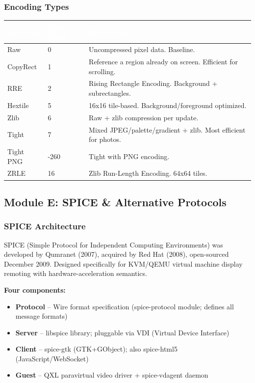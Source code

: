 \documentclass[11pt,letterpaper]{article}
\newcommand{\tableheader}[1]{\textbf{\sffamily\textcolor{white}{#1}}}
\begin{document}
\subsubsection{Encoding Types}

\begin{center}
\begin{tabularx}{\textwidth}{L{3cm}L{2cm}X}
\toprule
{}
\tableheader{Encoding} & \tableheader{Type Value} & \tableheader{Description} \\
\midrule
Raw & 0 & Uncompressed pixel data. Baseline. \\
CopyRect & 1 & Reference a region already on screen. Efficient for scrolling. \\
RRE & 2 & Rising Rectangle Encoding. Background + subrectangles. \\
Hextile & 5 & 16x16 tile-based. Background/foreground optimized. \\
Zlib & 6 & Raw + zlib compression per update. \\
Tight & 7 & Mixed JPEG/palette/gradient + zlib. Most efficient for photos. \\
Tight PNG & -260 & Tight with PNG encoding. \\
ZRLE & 16 & Zlib Run-Length Encoding. 64x64 tiles. \\
\bottomrule
\end{tabularx}
\end{center}

\subsection{Module E: SPICE \& Alternative Protocols}

\subsubsection{SPICE Architecture}

SPICE (Simple Protocol for Independent Computing Environments) was developed by Qumranet (2007), acquired by Red Hat (2008), open-sourced December 2009. Designed specifically for KVM/QEMU virtual machine display remoting with hardware-acceleration semantics.

\textbf{Four components:}
\begin{itemize}
\item \textbf{Protocol} -- Wire format specification (spice-protocol module; defines all message formats)
\item \textbf{Server} -- libspice library; pluggable via VDI (Virtual Device Interface)
\item \textbf{Client} -- spice-gtk (GTK+GObject); also spice-html5 (JavaScript/WebSocket)
\item \textbf{Guest} -- QXL paravirtual video driver + spice-vdagent daemon
\end{itemize}
\end{document}
